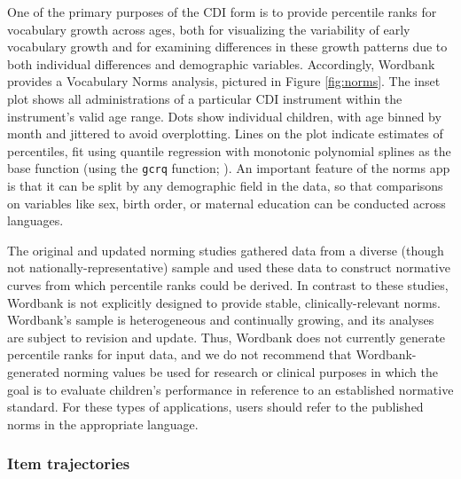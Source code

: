 \documentclass[doc,noapacite]{apa2}
\begin{document}
One of the primary purposes of the CDI form is to provide percentile ranks for vocabulary growth across ages, both for visualizing the variability of early vocabulary growth and for examining differences in these growth patterns due to both individual differences and demographic variables. Accordingly, Wordbank provides a Vocabulary Norms analysis, pictured in Figure \ref{fig:norms}. The inset plot shows all administrations of a particular CDI instrument within the instrument's valid age range. Dots show individual children, with age binned by month and jittered to avoid overplotting. Lines on the plot indicate estimates of percentiles, fit using quantile regression with monotonic polynomial splines as the base function (using the \texttt{gcrq} function; ). An important feature of the norms app is that it can be split by any demographic field in the data, so that comparisons on variables like sex, birth order, or maternal education can be conducted across languages. 

The original and updated norming studies \cite{fenson1994,fenson2007} gathered data from a diverse (though not nationally-representative) sample and used these data to construct normative curves from which percentile ranks could be derived. In contrast to these studies, Wordbank is not explicitly designed to provide stable, clinically-relevant norms. Wordbank's sample is heterogeneous and continually growing, and its analyses are subject to revision and update. Thus, Wordbank does not currently generate percentile ranks for input data, and we do not recommend that Wordbank-generated norming values be used for research or clinical purposes in which the goal is to evaluate children's performance in reference to an established normative standard. For these types of applications, users should refer to the published norms in the appropriate language. 

\subsubsection{Item trajectories}
\end{document}

